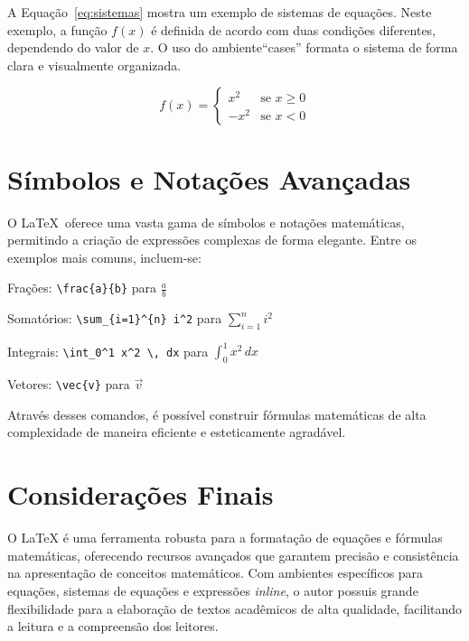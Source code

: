 \documentclass[
    12pt
    ,oneside
    ,a4paper
    ,chapter=TITLE
    ,section=TITLE
    ,sumario=abnt-6027-2012]{abntex2}
\begin{document}
A Equação~\eqref{eq:sistemas} mostra um exemplo de sistemas de equações. Neste exemplo, a função \( f(x) \) é definida de acordo com duas condições diferentes, dependendo do valor de \( x \). O uso do ambiente``cases'' formata o sistema de forma clara e visualmente organizada.


\begin{equation}
    f(x) =
    \begin{cases}
        x^2 & \text{se } x \geq 0 \\
        -x^2 & \text{se } x < 0
    \end{cases}
    \label{eq:sistemas}
\end{equation}


\section{Símbolos e Notações Avançadas}

O \LaTeX\ oferece uma vasta gama de símbolos e notações matemáticas, permitindo a criação de expressões complexas de forma elegante. Entre os exemplos mais comuns, incluem-se:

\begin{alineas}
    \item Frações: \verb|\frac{a}{b}| para \( \frac{a}{b} \)
    \item Somatórios: \verb|\sum_{i=1}^{n} i^2| para \( \sum_{i=1}^{n} i^2 \)
    \item Integrais: \verb|\int_0^1 x^2 \, dx| para \( \int_0^1 x^2 \, dx \)
    \item Vetores: \verb|\vec{v}| para \( \vec{v} \)
\end{alineas}

Através desses comandos, é possível construir fórmulas matemáticas de alta complexidade de maneira eficiente e esteticamente agradável.

\section{Considerações Finais}

O LaTeX é uma ferramenta robusta para a formatação de equações e fórmulas matemáticas, oferecendo recursos avançados que garantem precisão e consistência na apresentação de conceitos matemáticos. Com ambientes específicos para equações, sistemas de equações e expressões \textit{inline}, o autor possuis grande flexibilidade para a elaboração de textos acadêmicos de alta qualidade, facilitando a leitura e a compreensão dos leitores.
\end{document}
